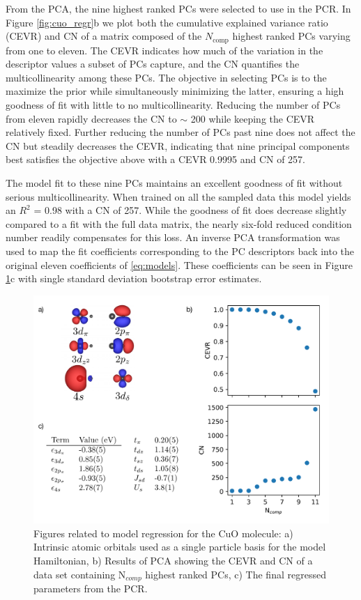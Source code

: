 \documentclass[12pt]{article}
\begin{document}
From the PCA, the nine highest ranked PCs were selected to use in the PCR.
In Figure \eqref{fig:cuo_regr}b we plot both the cumulative explained variance ratio (CEVR) and CN of a matrix composed of the $N_\text{comp}$ highest ranked PCs varying from one to eleven.
The CEVR indicates how much of the variation in the descriptor values a subset of PCs capture, and the CN quantifies the multicollinearity among these PCs.
The objective in selecting PCs is to the maximize the prior while simultaneously minimizing the latter, ensuring a high goodness of fit with little to no multicollinearity.
Reducing the number of PCs from eleven rapidly decreases the CN to $\sim $ 200 while keeping the CEVR relatively fixed.
Further reducing the number of PCs past nine does not affect the CN but steadily decreases the CEVR, indicating that nine principal components best satisfies the objective above with a CEVR 0.9995 and CN of 257.

The model fit to these nine PCs maintains an excellent goodness of fit without serious multicollinearity.
When trained on all the sampled data this model yields an $R^2$ = 0.98 with a CN of 257. 
While the goodness of fit does decrease slightly compared to a fit with the full data matrix, the nearly six-fold reduced condition number readily compensates for this loss.
An inverse PCA transformation was used to map the fit coefficients corresponding to the PC descriptors back into the original eleven coefficients of \eqref{eq:models}.
These coefficients can be seen in Figure \ref{fig:cuo_regr}c with single standard deviation bootstrap error estimates.

\begin{figure}
\centering
\includegraphics[width=1.0\linewidth]{./figs/cuo_regr.pdf}
\caption{Figures related to model regression for the CuO molecule: a) Intrinsic atomic orbitals used as a single particle basis for the model Hamiltonian, b) Results of PCA showing the CEVR and CN of a data set containing N$_{comp}$  highest ranked PCs, c) The final regressed parameters from the PCR.}
\label{fig:cuo_regr}
\end{figure}
\end{document}
